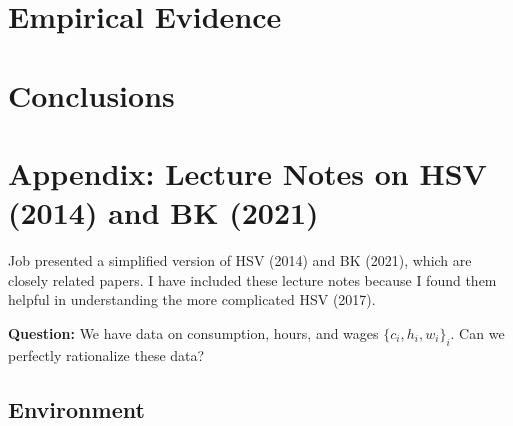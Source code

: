 \documentclass{article}
\begin{document}
\section{Empirical Evidence}

\section{Conclusions}

\pagebreak

\section*{Appendix: Lecture Notes on HSV (2014) and BK (2021)}

Job presented a simplified version of HSV (2014) and BK (2021), which are closely related papers. I have included these lecture notes because I found them helpful in understanding the more complicated HSV (2017). 

\bigskip

\textbf{Question:} We have data on consumption, hours, and wages $\{c_i, h_i, w_i\}_i$. Can we perfectly rationalize these data?

\subsection*{Environment}
\end{document}
